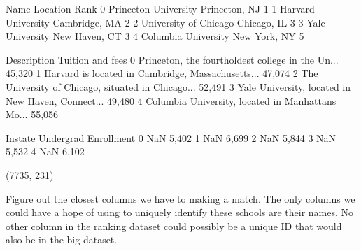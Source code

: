 \documentclass[letterpaper,10pt,english]{jupyterBook}
\begin{document}
\begin{sphinxVerbatim}[commandchars=\\\{\}]
     
\end{sphinxVerbatim}

\begin{sphinxVerbatim}[commandchars=\\\{\}]
                    Name       Location  Rank  \PYGZbs{}
0   Princeton University  Princeton, NJ     1   
1     Harvard University  Cambridge, MA     2   
2  University of Chicago    Chicago, IL     3   
3        Yale University  New Haven, CT     3   
4    Columbia University   New York, NY     5   

                                         Description Tuition and fees  \PYGZbs{}
0  Princeton, the fourth\PYGZhy{}oldest college in the Un...         \PYGZdl{}45,320    
1  Harvard is located in Cambridge, Massachusetts...         \PYGZdl{}47,074    
2  The University of Chicago, situated in Chicago...         \PYGZdl{}52,491    
3  Yale University, located in New Haven, Connect...         \PYGZdl{}49,480    
4  Columbia University, located in Manhattan\PYGZsq{}s Mo...         \PYGZdl{}55,056    

  In\PYGZhy{}state Undergrad Enrollment  
0      NaN                5,402  
1      NaN                6,699  
2      NaN                5,844  
3      NaN                5,532  
4      NaN                6,102  
\end{sphinxVerbatim}

\begin{sphinxVerbatim}[commandchars=\\\{\}]
     
\end{sphinxVerbatim}

\begin{sphinxVerbatim}[commandchars=\\\{\}]
(7735, 231)
\end{sphinxVerbatim}

\sphinxAtStartPar
{} Figure out the closest columns we have to making a match.  The only columns we could have a hope of using to uniquely identify these schools are their names.  No other column in the ranking dataset could possibly be a unique ID that would also be in the big dataset.
\end{document}
